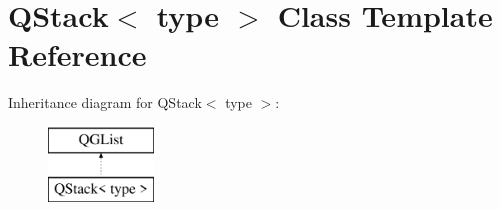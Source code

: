 \hypertarget{class_q_stack}{}\section{Q\+Stack$<$ type $>$ Class Template Reference}
\label{class_q_stack}
Inheritance diagram for Q\+Stack$<$ type $>$\+:\begin{figure}[H]
\begin{center}
\leavevmode
\includegraphics[height=2.000000cm]{class_q_stack}
\end{center}
\end{figure}

